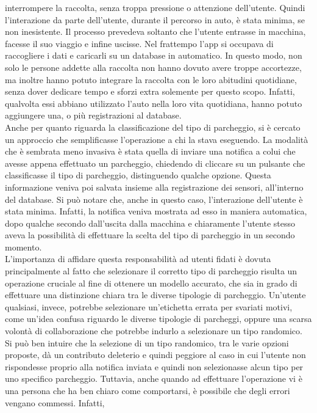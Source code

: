 interrompere la raccolta, senza troppa pressione o attenzione dell'utente. Quindi l'interazione
da parte dell'utente,
durante il percorso in auto, è stata minima, se non inesistente. Il processo prevedeva soltanto
che l'utente entrasse in macchina, facesse il suo viaggio e infine uscisse. Nel frattempo 
l'app si occupava di raccogliere i dati e caricarli su un database in automatico. In questo
modo, non solo le persone addette alla raccolta non hanno dovuto avere troppe accortezze, ma
inoltre hanno potuto integrare la raccolta con le loro abitudini quotidiane, senza dover
dedicare tempo e sforzi extra solemente per questo scopo. Infatti, qualvolta essi abbiano
utilizzato l'auto nella loro vita quotidiana, hanno potuto aggiungere una, o più registrazioni
al database. \\
Anche per quanto riguarda la classificazione del tipo di parcheggio, si è cercato un approccio
che semplificasse l'operazione a chi la stava eseguendo. La modalità che è sembrata meno 
invasiva è stata quella di inviare una notifica a colui che avesse appena effettuato un
parcheggio, chiedendo di cliccare su un pulsante che classificasse il tipo di parcheggio, 
distinguendo qualche opzione. Questa informazione veniva poi salvata insieme alla registrazione
dei sensori, all'interno del database. Si può notare che, anche in questo caso, l'interazione
dell'utente è stata minima. Infatti, la notifica veniva mostrata ad esso in maniera automatica,
dopo qualche secondo dall'uscita dalla macchina e chiaramente l'utente stesso aveva la possibilità
di effettuare la scelta del tipo di parcheggio in un secondo momento.\\
L'importanza di affidare questa responsabilità ad utenti fidati è dovuta principalmente al fatto
che selezionare il corretto tipo di parcheggio risulta un operazione cruciale al fine di ottenere
un modello accurato, che sia in grado di effettuare una distinzione chiara tra le diverse tipologie
di parcheggio. Un'utente qualsiasi, invece, potrebbe selezionare un'etichetta errata per svariati
motivi, come un'idea confusa riguardo le diverse tipologie di parcheggi, oppure una scarsa volontà
di collaborazione che potrebbe indurlo a selezionare un tipo randomico. Si può ben intuire che la
selezione di un tipo randomico, tra le varie opzioni proposte, dà un contributo deleterio e quindi
peggiore al caso in cui l'utente non rispondesse proprio alla notifica inviata e quindi non selezionasse
alcun tipo per uno specifico parcheggio. Tuttavia, anche quando ad effettuare l'operazione vi è una
persona che ha ben chiaro come comportarsi, è possibile che degli errori vengano commessi. Infatti,
